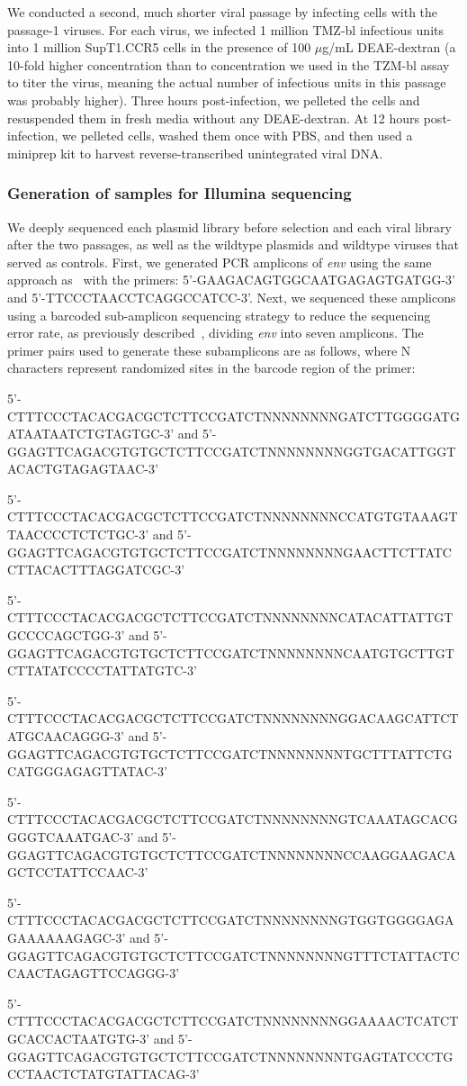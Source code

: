 \documentclass[9pt]{elife}
\begin{document}
We conducted a second, much shorter viral passage by infecting cells with the passage-1 viruses.
For each virus, we infected 1 million TMZ-bl infectious units into 1 million SupT1.CCR5 cells in the presence of 100 $\mu$g/mL DEAE-dextran (a 10-fold higher concentration than to concentration we used in the TZM-bl assay to titer the virus, meaning the actual number of infectious units in this passage was probably higher).
Three hours post-infection, we pelleted the cells and resuspended them in fresh media without any DEAE-dextran.
At 12 hours post-infection, we pelleted cells, washed them once with PBS, and then used a miniprep kit to harvest reverse-transcribed unintegrated viral DNA.

\subsubsection*{Generation of samples for Illumina sequencing}
We deeply sequenced each plasmid library before selection and each viral library after the two passages, as well as the wildtype plasmids and wildtype viruses that served as controls.
First, we generated PCR amplicons of \textit{env} using the same approach as~\cite{dingens2017comprehensive} with the primers: 5'-GAAGACAGTGGCAATGAGAGTGATGG-3' and 5'-TTCCCTAACCTCAGGCCATCC-3'.
Next, we sequenced these amplicons using a barcoded sub-amplicon sequencing strategy to reduce the sequencing error rate, as previously described~\cite{doud2016accurate,haddox2016experimental}, dividing \textit{env} into seven amplicons.
The primer pairs used to generate these subamplicons are as follows, where N characters represent randomized sites in the barcode region of the primer:

\begin{itemize}
{\footnotesize
\item 5'-CTTTCCCTACACGACGCTCTTCCGATCTNNNNNNNNGATCTTGGGGATGATAATAATCTGTAGTGC-3' and 5'-GGAGTTCAGACGTGTGCTCTTCCGATCTNNNNNNNNGGTGACATTGGTACACTGTAGAGTAAC-3'
\item 5'-CTTTCCCTACACGACGCTCTTCCGATCTNNNNNNNNCCATGTGTAAAGTTAACCCCTCTCTGC-3' and 5'-GGAGTTCAGACGTGTGCTCTTCCGATCTNNNNNNNNGAACTTCTTATCCTTACACTTTAGGATCGC-3'
\item 5'-CTTTCCCTACACGACGCTCTTCCGATCTNNNNNNNNCATACATTATTGTGCCCCAGCTGG-3' and 5'-GGAGTTCAGACGTGTGCTCTTCCGATCTNNNNNNNNCAATGTGCTTGTCTTATATCCCCTATTATGTC-3'
\item 5'-CTTTCCCTACACGACGCTCTTCCGATCTNNNNNNNNGGACAAGCATTCTATGCAACAGGG-3' and 5'-GGAGTTCAGACGTGTGCTCTTCCGATCTNNNNNNNNTGCTTTATTCTGCATGGGAGAGTTATAC-3'
\item 5'-CTTTCCCTACACGACGCTCTTCCGATCTNNNNNNNNGTCAAATAGCACGGGGTCAAATGAC-3' and 5'-GGAGTTCAGACGTGTGCTCTTCCGATCTNNNNNNNNCCAAGGAAGACAGCTCCTATTCCAAC-3'
\item 5'-CTTTCCCTACACGACGCTCTTCCGATCTNNNNNNNNGTGGTGGGGAGAGAAAAAAGAGC-3' and 5'-GGAGTTCAGACGTGTGCTCTTCCGATCTNNNNNNNNGTTTCTATTACTCCAACTAGAGTTCCAGGG-3'
\item 5'-CTTTCCCTACACGACGCTCTTCCGATCTNNNNNNNNGGAAAACTCATCTGCACCACTAATGTG-3' and 5'-GGAGTTCAGACGTGTGCTCTTCCGATCTNNNNNNNNTGAGTATCCCTGCCTAACTCTATGTATTACAG-3'
}
\end{itemize}
\end{document}
